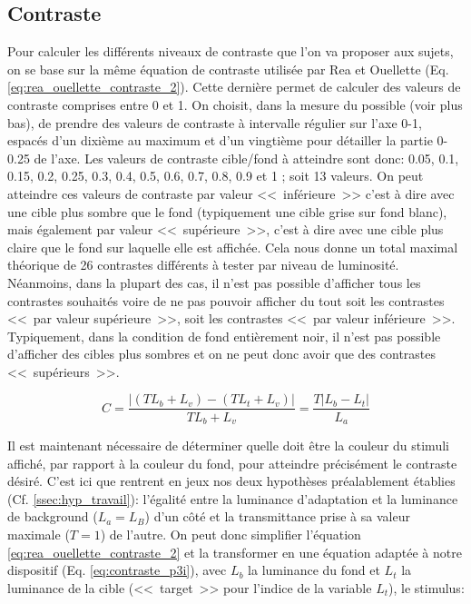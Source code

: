 	\subsection{Contraste}
	\label{ssec:contraste}
	\par Pour calculer les différents niveaux de contraste que l'on va proposer aux sujets, on se base sur la même équation de contraste utilisée par Rea et Ouellette (Eq. \ref{eq:rea_ouellette_contraste_2}). Cette dernière permet de calculer des valeurs de contraste comprises entre 0 et 1. On choisit, dans la mesure du possible (voir plus bas), de prendre des valeurs de contraste à intervalle régulier sur l'axe 0-1, espacés d'un dixième au maximum et d'un vingtième pour détailler la partie 0-0.25 de l'axe. Les valeurs de contraste cible/fond à atteindre sont donc: 0.05, 0.1, 0.15, 0.2, 0.25, 0.3, 0.4, 0.5, 0.6, 0.7, 0.8, 0.9 et 1 ; soit 13 valeurs. On peut atteindre ces valeurs de contraste par valeur <<~inférieure~>> c'est à dire avec une cible plus sombre que le fond (typiquement une cible grise sur fond blanc), mais également par valeur <<~supérieure~>>, c'est à dire avec une cible plus claire que le fond sur laquelle elle est affichée. Cela nous donne un total maximal théorique de 26 contrastes différents à tester par niveau de luminosité. Néanmoins, dans la plupart des cas, il n'est pas possible d'afficher tous les contrastes souhaités voire de ne pas pouvoir afficher du tout soit les contrastes <<~par valeur supérieure~>>, soit les contrastes <<~par valeur inférieure~>>. Typiquement, dans la condition de fond entièrement noir, il n'est pas possible d'afficher des cibles plus sombres et on ne peut donc avoir que des contrastes <<~supérieurs~>>.
	
	\begin{equation}
		C = \frac{\vert (T L_b + L_v) - (T L_t + L_v) \vert}{T L_b + L_v} = \frac{T \vert L_b - L_t \vert}{L_a}
		\label{eq:rea_ouellette_contraste_2}
	\end{equation}
	
	\par Il est maintenant nécessaire de déterminer quelle doit être la couleur du stimuli affiché, par rapport à la couleur du fond, pour atteindre précisément le contraste désiré. C'est ici que rentrent en jeux nos deux hypothèses préalablement établies (Cf. \ref{ssec:hyp_travail}): l'égalité entre la luminance d'adaptation et la luminance de background ($L_a = L_B$) d'un côté et la transmittance prise à sa valeur maximale ($T = 1$) de l'autre. On peut donc simplifier l'équation \ref{eq:rea_ouellette_contraste_2} et la transformer en une équation adaptée à notre dispositif (Eq. \ref{eq:contraste_p3i}), avec $L_b$ la luminance du fond et $L_t$ la luminance de la cible (<<~target~>> pour l'indice de la variable $L_t$), le stimulus:
	
